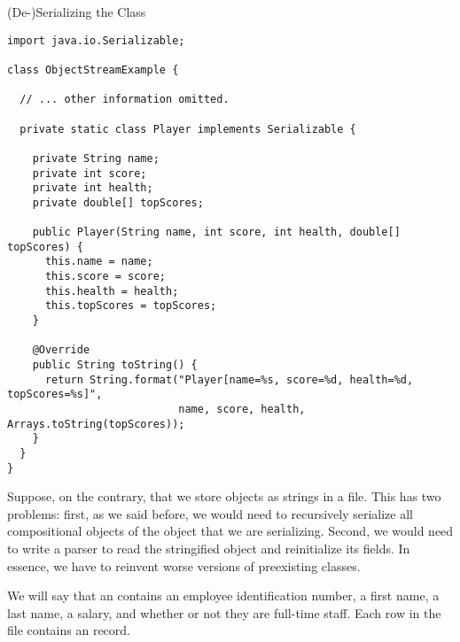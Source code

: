 \begin{cl}{(De-)Serializing the  Class}
\begin{lstlisting}[language=MyJava]
import java.io.Serializable;

class ObjectStreamExample {

  // ... other information omitted.

  private static class Player implements Serializable {

    private String name;
    private int score;
    private int health;
    private double[] topScores;
    
    public Player(String name, int score, int health, double[] topScores) {
      this.name = name;
      this.score = score;
      this.health = health;
      this.topScores = topScores;
    }
    
    @Override
    public String toString() {
      return String.format("Player[name=%s, score=%d, health=%d, topScores=%s]", 
                           name, score, health, Arrays.toString(topScores));
    }
  }
}
\end{lstlisting}
\end{cl}

Suppose, on the contrary, that we store objects as strings in a file. This has two problems: first, as we said before, we would need to recursively serialize all compositional objects of the object that we are serializing. Second, we would need to write a parser to read the stringified object and reinitialize its fields. In essence, we have to reinvent worse versions of preexisting classes.


We will say that an  contains an employee identification number, a first name, a last name, a salary, and whether or not they are full-time staff. Each row in the file contains an  record.

